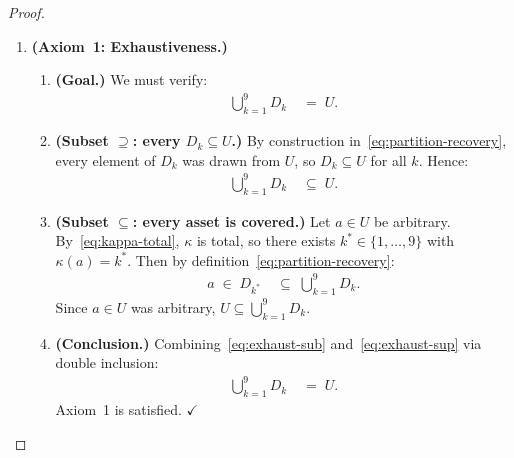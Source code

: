 \documentclass[12pt,openany]{book}
\newcommand{\calU}{\mathcal{U}}
\newcommand{\calD}{\mathcal{D}}
\numberwithin{equation}{chapter}
\theoremstyle{plain}
\theoremstyle{definition}
\theoremstyle{remark}
\def\calU{U}%
\def\calD{D}%
\def\mathcal#1{#1}%
\begin{document}
\begin{proof}
\begin{enumerate}
\begin{enumerate}
  \end{enumerate}

  \item \textbf{(Axiom~1: Exhaustiveness.)}

  \begin{enumerate}

    \item \textbf{(Goal.)}
          We must verify:
          \begin{align}
            \bigcup_{k=1}^{9} \calD_k &\;=\; \calU.
            \label{eq:exhaust-goal}
          \end{align}

    \item \textbf{(Subset $\supseteq$: every $\calD_k \subseteq \calU$.)}
          By construction in~\eqref{eq:partition-recovery},
          every element of $\calD_k$ was drawn from $\calU$,
          so $\calD_k \subseteq \calU$ for all $k$.
          Hence:
          \begin{align}
            \bigcup_{k=1}^{9} \calD_k
            &\;\subseteq\; \calU.
            \label{eq:exhaust-sub}
          \end{align}

    \item \textbf{(Subset $\subseteq$: every asset is covered.)}
          Let $a \in \calU$ be arbitrary.
          By~\eqref{eq:kappa-total}, $\kappa$ is total, so there
          exists $k^* \in \{1,\ldots,9\}$ with $\kappa(a) = k^*$.
          Then by definition~\eqref{eq:partition-recovery}:
          \begin{align}
            a \;\in\; \calD_{k^*}
            &\;\subseteq\;
            \bigcup_{k=1}^{9} \calD_k.
            \label{eq:exhaust-sup}
          \end{align}
          Since $a \in \calU$ was arbitrary,
          $\calU \subseteq \bigcup_{k=1}^{9} \calD_k$.

    \item \textbf{(Conclusion.)}
          Combining~\eqref{eq:exhaust-sub} and~\eqref{eq:exhaust-sup}
          via double inclusion:
          \begin{align}
            \bigcup_{k=1}^{9} \calD_k &\;=\; \calU.
          \end{align}
          Axiom~1 is satisfied. \hfill$\checkmark$

  \end{enumerate}


\end{enumerate}
\end{proof}
\end{document}
